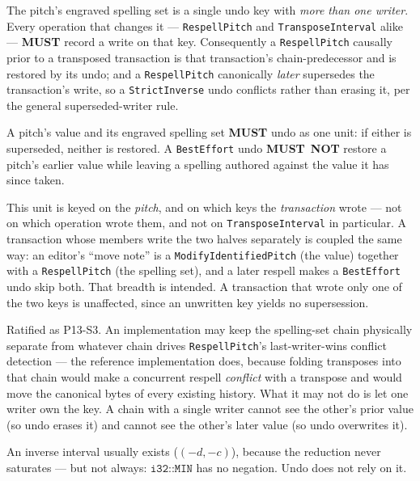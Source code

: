 \documentclass[11pt,letterpaper]{report}
\newcounter{requirement}[chapter]
\newcommand{\MUST}{\textbf{MUST}}
\newcommand{\MUSTNOT}{\textbf{MUST}\nobreak\ \textbf{NOT}}
\begin{document}
\begin{requirement}
  \label{req:opcat:spelling-set-chain}
  The pitch's engraved spelling set is a single undo key with \emph{more than
  one writer}. Every operation that changes it --- \texttt{RespellPitch} and
  \texttt{TransposeInterval} alike --- \MUST{} record a write on that key.
  Consequently a \texttt{RespellPitch} causally prior to a transposed
  transaction is that transaction's chain-predecessor and is restored by its
  undo; and a \texttt{RespellPitch} canonically \emph{later} supersedes the
  transaction's write, so a \texttt{StrictInverse} undo conflicts rather than
  erasing it, per the general superseded-writer rule.

  A pitch's value and its engraved spelling set \MUST{} undo as one unit: if
  either is superseded, neither is restored. A \texttt{BestEffort} undo
  \MUSTNOT{} restore a pitch's earlier value while leaving a spelling authored
  against the value it has since taken.

  This unit is keyed on the \emph{pitch}, and on which keys the
  \emph{transaction} wrote --- not on which operation wrote them, and not on
  \texttt{TransposeInterval} in particular. A transaction whose members write
  the two halves separately is coupled the same way: an editor's ``move note''
  is a \texttt{ModifyIdentifiedPitch} (the value) together with a
  \texttt{RespellPitch} (the spelling set), and a later respell makes a
  \texttt{BestEffort} undo skip both. That breadth is intended. A transaction
  that wrote only one of the two keys is unaffected, since an unwritten key
  yields no supersession.
\end{requirement}

\begin{rationale}
  Ratified as P13-S3. An implementation may keep the spelling-set chain
  physically separate from whatever chain drives \texttt{RespellPitch}'s
  last-writer-wins conflict detection --- the reference implementation does,
  because folding transposes into that chain would make a concurrent respell
  \emph{conflict} with a transpose and would move the canonical bytes of every
  existing history. What it may not do is let one writer own the key. A chain
  with a single writer cannot see the other's prior value (so undo erases it) and
  cannot see the other's later value (so undo overwrites it).
\end{rationale}

An inverse interval usually exists ($(-d, -c)$), because the reduction never
saturates --- but not always: $\texttt{i32::MIN}$ has no negation. Undo does not
rely on it.
\end{document}
